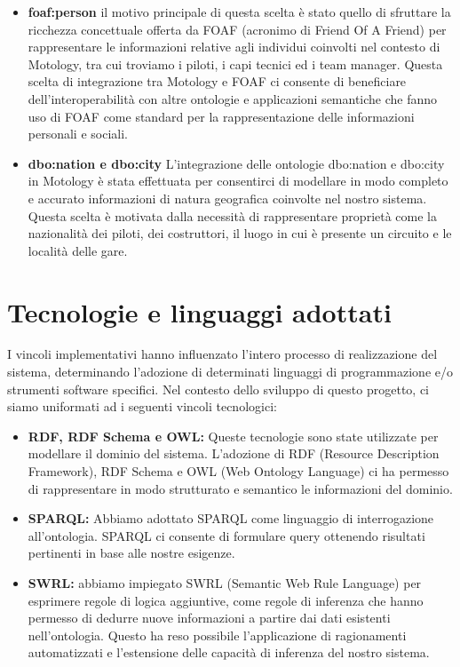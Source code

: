 \begin{itemize}
    \item \textbf{foaf:person} il motivo principale di questa scelta è stato quello di sfruttare la ricchezza concettuale offerta da FOAF (acronimo di Friend Of A Friend) per rappresentare le informazioni relative agli individui coinvolti nel contesto di Motology, tra cui troviamo i piloti, i capi tecnici ed i team manager. Questa scelta di integrazione tra Motology e FOAF ci consente di beneficiare dell'interoperabilità con altre ontologie e applicazioni semantiche che fanno uso di FOAF come standard per la rappresentazione delle informazioni personali e sociali.

    \item \textbf{dbo:nation e dbo:city} L'integrazione delle ontologie dbo:nation e dbo:city in Motology è stata effettuata per consentirci di modellare in modo completo e accurato informazioni di natura geografica coinvolte nel nostro sistema. Questa scelta è motivata dalla necessità di rappresentare proprietà come la nazionalità dei piloti, dei costruttori, il luogo in cui è presente un circuito e le località delle gare.
\end{itemize}

\section{Tecnologie e linguaggi adottati}
I vincoli implementativi hanno influenzato l'intero processo di realizzazione del sistema, determinando l'adozione di determinati linguaggi di programmazione e/o strumenti software specifici. Nel contesto dello sviluppo di questo progetto, ci siamo uniformati ad i seguenti vincoli tecnologici:

\begin{itemize}
    \item \textbf{RDF, RDF Schema e OWL:} Queste tecnologie sono state utilizzate per modellare il dominio del sistema. L'adozione di RDF (Resource Description Framework), RDF Schema e OWL (Web Ontology Language) ci ha permesso di rappresentare in modo strutturato e semantico le informazioni del dominio.
    \item \textbf{SPARQL:} Abbiamo adottato SPARQL come linguaggio di interrogazione all'ontologia. SPARQL ci consente di formulare query ottenendo risultati pertinenti in base alle nostre esigenze.
    \item \textbf{SWRL:} abbiamo impiegato SWRL (Semantic Web Rule Language) per esprimere regole di logica aggiuntive, come regole di inferenza che hanno permesso di dedurre nuove informazioni a partire dai dati esistenti nell'ontologia. Questo ha reso possibile l'applicazione di ragionamenti automatizzati e l'estensione delle capacità di inferenza del nostro sistema.
\end{itemize}
